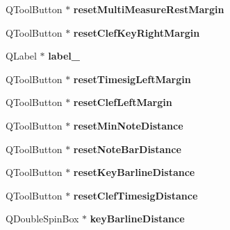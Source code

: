 \begin{DoxyCompactItemize}
\mbox{\label{class_ui___edit_style_base_a16a505091eb231dca1b259d0af844ccb}} 
Q\+Tool\+Button $\ast$ {\bfseries reset\+Multi\+Measure\+Rest\+Margin}
\item 
\mbox{\label{class_ui___edit_style_base_ae36687d6ce54fb4432289fdd8e05e04e}} 
Q\+Tool\+Button $\ast$ {\bfseries reset\+Clef\+Key\+Right\+Margin}
\item 
\mbox{\label{class_ui___edit_style_base_a96359610fcbafcd62d2dd04598cca8b2}} 
Q\+Label $\ast$ {\bfseries label\+\_}
\item 
\mbox{\label{class_ui___edit_style_base_a2f71bfa348700cb4115030b919bee038}} 
Q\+Tool\+Button $\ast$ {\bfseries reset\+Timesig\+Left\+Margin}
\item 
\mbox{\label{class_ui___edit_style_base_a8eab5b2b98d6889f07e710a65f599197}} 
Q\+Tool\+Button $\ast$ {\bfseries reset\+Clef\+Left\+Margin}
\item 
\mbox{\label{class_ui___edit_style_base_a62c2fbd75bb9bafbcbf27bd7131c67be}} 
Q\+Tool\+Button $\ast$ {\bfseries reset\+Min\+Note\+Distance}
\item 
\mbox{\label{class_ui___edit_style_base_a1f30de783f63b2661ec62428a3f89b87}} 
Q\+Tool\+Button $\ast$ {\bfseries reset\+Note\+Bar\+Distance}
\item 
\mbox{\label{class_ui___edit_style_base_a739c8af73ef614d3c7f96bde2264bc3d}} 
Q\+Tool\+Button $\ast$ {\bfseries reset\+Key\+Barline\+Distance}
\item 
\mbox{\label{class_ui___edit_style_base_a2d1480d236a826e96a2dbe9c6ee4e9d7}} 
Q\+Tool\+Button $\ast$ {\bfseries reset\+Clef\+Timesig\+Distance}
\item 
\mbox{\label{class_ui___edit_style_base_a51cfa544cb967c28fc9d954137610456}} 
Q\+Double\+Spin\+Box $\ast$ {\bfseries key\+Barline\+Distance}
\item 

\end{DoxyCompactItemize}

